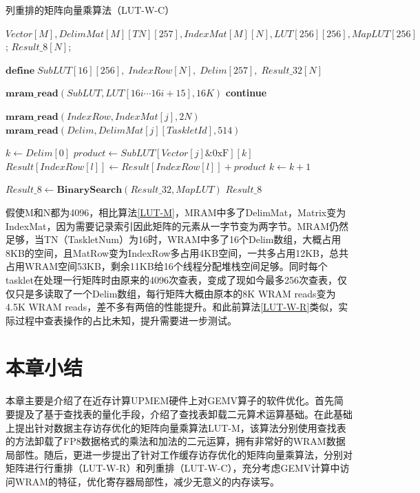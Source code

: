 \begin{algorithm}[!htbp]
    \caption{列重排的矩阵向量乘算法（LUT-W-C）}
    \label{LUT-W-C}
    \begin{algorithmic}[1]
        \Require $Vector[M], DelimMat[M][TN][257], IndexMat[M][N], LUT[256][256], MapLUT[256]$; %
        \Ensure $Result\_8[N]$; %

        \State $\textbf{define}\; SubLUT[16][256],\;IndexRow[N],\;Delim[257],\;Result\_32[N]$

            \State $\textbf{mram\_read}(SubLUT, LUT[16i \cdots 16i + 15], 16K)$
            \Comment{\textcolor{blue}{parallel in 16 for each tasklet}}
                    \State \textbf{continue}
                \EndIf
                
                \State $\textbf{mram\_read}(IndexRow, IndexMat[j], 2N)$
                \Comment{\textcolor{blue}{parallel in N for each tasklet}}
                \State $\textbf{mram\_read}(Delim, DelimMat[j][TaskletId], 514)$

                \State $k \gets Delim[0]$
                    \State $product \gets SubLUT[Vector[j] \& \text{0xF}][k]$
                        \State $Result[IndexRow[l]] \gets Result[IndexRow[l]] + product$
                    \EndFor
                    \State $k \gets k + 1$
                \EndWhile
            \EndFor
        \EndFor

        \State $Result\_8 \gets \textbf{BinarySearch}(Result\_32, MapLUT)$
        \Comment{\textcolor{blue}{parallel in N for each tasklet}}
        \State \Return $Result\_8$
    \end{algorithmic}
\end{algorithm}

假使M和N都为4096，相比算法\ref{LUT-M}，MRAM中多了DelimMat，Matrix变为IndexMat，因为需要记录索引因此矩阵的元素从一字节变为两字节。MRAM仍然足够，当TN（TaskletNum）为16时，WRAM中多了16个Delim数组，大概占用8KB的空间，且MatRow变为IndexRow多占用4KB空间，一共多占用12KB，总共占用WRAM空间53KB，剩余11KB给16个线程分配堆栈空间足够。同时每个tasklet在处理一行矩阵时由原来的4096次查表，变成了现如今最多256次查表，仅仅只是多读取了一个Delim数组，每行矩阵大概由原本的8K WRAM reads变为4.5K WRAM reads，差不多有两倍的性能提升。和此前算法\ref{LUT-W-R}类似，实际过程中查表操作的占比未知，提升需要进一步测试。

\section{本章小结}
本章主要是介绍了在近存计算UPMEM硬件上对GEMV算子的软件优化。首先简要提及了基于查找表的量化手段，介绍了查找表卸载二元算术运算基础。在此基础上提出针对数据主存访存优化的矩阵向量乘算法LUT-M，该算法分别使用查找表的方法卸载了FP8数据格式的乘法和加法的二元运算，拥有非常好的WRAM数据局部性。随后，更进一步提出了针对工作缓存访存优化的矩阵向量乘算法，分别对矩阵进行行重排（LUT-W-R）和列重排（LUT-W-C），充分考虑GEMV计算中访问WRAM的特征，优化寄存器局部性，减少无意义的内存读写。